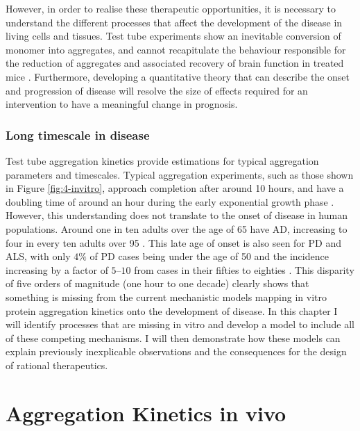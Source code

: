 However, in order to realise these therapeutic opportunities, it is necessary to understand the different processes that affect the development of the disease in living cells and tissues. Test tube experiments show an inevitable conversion of monomer into aggregates, and cannot recapitulate the behaviour responsible for the reduction of aggregates and associated recovery of brain function in treated mice \cite{cole_-synuclein_nodate}. Furthermore, developing a quantitative theory that can describe the onset and progression of disease will resolve the size of effects required for an intervention to have a meaningful change in prognosis.

\subsubsection{Long timescale in disease}

Test tube aggregation kinetics provide estimations for typical aggregation parameters and timescales. Typical aggregation experiments, such as those shown in Figure \ref{fig:4-invitro}, approach completion after around 10 hours, and have a doubling time of around an hour during the early exponential growth phase \cite{meisl_mechanistic_2022}. However, this understanding does not translate to the onset of disease in human populations. Around one in ten adults over the age of 65 have AD, increasing to four in every ten adults over 95 \cite{hou_ageing_2019}. This late age of onset is also seen for PD and ALS, with only $4\%$ of PD cases being under the age of 50 and the incidence increasing by a factor of $5$–$10$ from cases in their fifties to eighties \cite{van_den_eeden_incidence_2003, poewe_parkinson_2017}. This disparity of five orders of magnitude (one hour to one decade) clearly shows that something is missing from the current mechanistic models mapping in vitro protein aggregation kinetics onto the development of disease. In this chapter I will identify processes that are missing in vitro and develop a model to include all of these competing mechanisms. I will then demonstrate how these models can explain previously inexplicable observations and the consequences for the design of rational therapeutics.

\section{Aggregation Kinetics in vivo}

